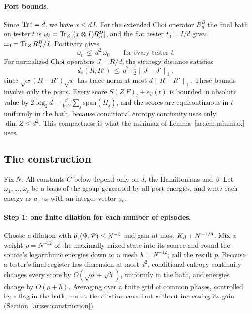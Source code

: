 \paragraph{Port bounds.} Since $\operatorname{Tr} t=d$, we have $x\le d\,I$. For the extended Choi operator $R_n^B$ the final bath on tester $t$ is $\omega_t=\operatorname{Tr}_Z[(x\otimes I)R_n^B]$, and the flat tester $t_0=I/d$ gives $\omega_0=\operatorname{Tr}_ZR_n^B/d$. Positivity gives
\begin{equation}\label{ar:eq:domination}
\omega_t\ \le\ d^2\,\omega_0\qquad\text{for every tester }t.
\end{equation}
For normalized Choi operators $J=R/d$, the strategy distance satisfies
\begin{equation}\label{ar:eq:choidistance}
d_{\mathrm c}(R,R')\ \le\ d^2\cdot\tfrac12\|J-J'\|_1,
\end{equation}
since $\sqrt x(R-R')\sqrt x$ has trace norm at most $d\|R-R'\|_1$. These bounds involve only the ports. Every score $S(Z|F)_t+e_\beta(t)$ is bounded in absolute value by $2\log_2d+\frac{\beta}{\ln2}\sum_j\mathrm{span}(H_j)$, and the scores are equicontinuous in $t$ uniformly in the bath, because conditional entropy continuity uses only $\dim Z\le d^2$. This compactness is what the minimax of Lemma~\ref{ar:lem:minimax} uses.

\subsection{The construction}\label{ar:app:construction}

Fix $N$. All constants $C$ below depend only on $d$, the Hamiltonians and $\beta$. Let $\omega_1,\dots,\omega_r$ be a basis of the group generated by all port energies, and write each energy as $a_e\cdot\omega$ with an integer vector $a_e$.

\paragraph{Step 1: one finite dilation for each number of episodes.} Choose a dilation with $d_{\mathrm c}(\Psi,\mathcal P)\le N^{-3}$ and gain at most $K_\beta+N^{-1/8}$. Mix a weight $\rho=N^{-12}$ of the maximally mixed state into its source and round the source's logarithmic energies down to a mesh $h=N^{-12}$; call the result $p$. Because a tester's final register has dimension at most $d^2$, conditional entropy continuity changes every score by $O(\sqrt\rho+\sqrt h)$, uniformly in the bath, and energies change by $O(\rho+h)$. Averaging over a finite grid of common phases, controlled by a flag in the bath, makes the dilation covariant without increasing its gain (Section~\ref{ar:sec:construction}).

